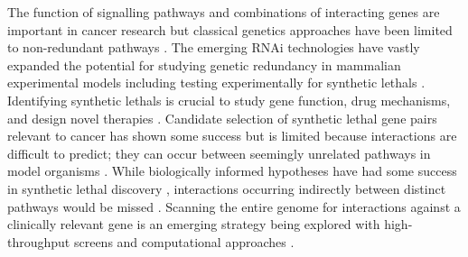 

The function of signalling pathways and combinations of interacting genes are important in cancer research but classical genetics approaches have been limited to non-redundant pathways \citep{Fraser2004}. The emerging \gls{RNAi} technologies have vastly expanded the potential for studying genetic redundancy in mammalian experimental models including testing experimentally for \glspl{synthetic lethal} \citep{Fraser2004}. Identifying \glspl{synthetic lethal} is crucial to study gene function, drug mechanisms, and design novel therapies \citep{Lum2004}. Candidate selection of \gls{synthetic lethal} gene pairs relevant to cancer has shown some success but is limited because interactions are difficult to predict; they can occur between seemingly unrelated pathways in model organisms \citep{Costanzo2011}. While biologically informed hypotheses have had some success in \gls{synthetic lethal} discovery \citep{Bitler2015, Bryant2005, Farmer2005}, interactions occurring indirectly between distinct pathways would be missed \citep{Boone2007, Costanzo2011}. Scanning the entire genome for interactions against a clinically relevant gene is an emerging strategy being explored with high-throughput screens \citep{Fece2015} and computational approaches \citep{Boucher2013, vanSteen2011}.  

